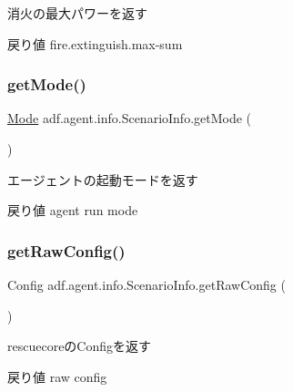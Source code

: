 消火の最大パワーを返す 

\begin{DoxyReturn}{戻り値}
fire.\+extinguish.\+max-\/sum 
\end{DoxyReturn}
\hypertarget{classadf_1_1agent_1_1info_1_1ScenarioInfo_a000d044bd9136cd5fea0f09ce3d80d4c}{}\label{classadf_1_1agent_1_1info_1_1ScenarioInfo_a000d044bd9136cd5fea0f09ce3d80d4c} 
\subsubsection{\texorpdfstring{get\+Mode()}{getMode()}}
{\footnotesize\ttfamily \hyperlink{enumadf_1_1agent_1_1info_1_1ScenarioInfo_1_1Mode}{Mode} adf.\+agent.\+info.\+Scenario\+Info.\+get\+Mode (\begin{DoxyParamCaption}{ }\end{DoxyParamCaption})}



エージェントの起動モードを返す 

\begin{DoxyReturn}{戻り値}
agent run mode 
\end{DoxyReturn}
\hypertarget{classadf_1_1agent_1_1info_1_1ScenarioInfo_ad3f65f6d6fbcc5bc162f96bd034e78de}{}\label{classadf_1_1agent_1_1info_1_1ScenarioInfo_ad3f65f6d6fbcc5bc162f96bd034e78de} 
\subsubsection{\texorpdfstring{get\+Raw\+Config()}{getRawConfig()}}
{\footnotesize\ttfamily Config adf.\+agent.\+info.\+Scenario\+Info.\+get\+Raw\+Config (\begin{DoxyParamCaption}{ }\end{DoxyParamCaption})}



rescuecoreの\+Configを返す 

\begin{DoxyReturn}{戻り値}
raw config 
\end{DoxyReturn}
\hypertarget{classadf_1_1agent_1_1info_1_1ScenarioInfo_afc3003e18c38d96a6466b09afd95ca82}{}\label{classadf_1_1agent_1_1info_1_1ScenarioInfo_afc3003e18c38d96a6466b09afd95ca82} 
